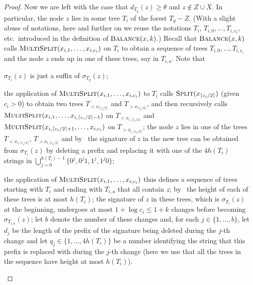 \documentclass[kpfonts]{patmorin}
\let\leq\leqslant
\let\geq\geqslant
\begin{document}
\begin{proof}
  Now we are left with the case that $d_{T_y}(z)\geq \theta$ and $z\not\in Z\cup X$. In particular, the node $z$ lies in some tree $T_i$ of the forest $T_y - Z$.
  (With a slight abuse of notations, here and further on we reuse the notations $T_i$, $T_{i,0},\ldots,T_{i,c_i}$, etc.\ introduced in the definition of $\textsc{Balance}(x,k)$.)
  Recall that $\textsc{Balance}(x,k)$ calls $\textsc{MultiSplit}(x_{i,1},\ldots,x_{i,c_i})$ on $T_i$ to obtain a sequence of trees $T_{i,0},\ldots,T_{i,c_i}$ and the node $z$ ends up in one of these trees, say in $T_{i,a}$.
  Note that
  \begin{compactenum}[(i)]
  \item $\sigma_{T_i}(z)$ is just a suffix of $\sigma_{T_y}(z)$;
  \item the application of $\textsc{MultiSplit}(x_{i,1},\ldots,x_{i,c_i})$ to $T_i$ calls $\textsc{Split}(x_{
  \lceil c_i/2\rceil})$ (given $c_i>0$) to obtain two trees $T_{<x_{\lceil c_i/2\rceil}}$ and $T_{>x_{\lceil c_i/2\rceil}}$, and then recursively calls $\textsc{MultiSplit}(x_{i,1},\ldots,x_{i,\lceil c_i/2\rceil-1})$  on $T_{<x_{i,\lceil c_i/2\rceil}}$ and $\textsc{MultiSplit}(x_{i,\lceil c_i/2\rceil+1},\ldots,x_{i,c_i})$  on $T_{>x_{i,\lceil c_i/2\rceil}}$;
  the node $z$ lies in one of the trees $T_{<x_{i,\lceil c_i/2\rceil}}$, $T_{>x_{i,\lceil c_i/2\rceil}}$ and by~ the signature of $z$ in the new tree can be obtained from $\sigma_{T_i}(z)$ by deleting a prefix and replacing it with one of the $4h(T_i)$ strings in $\bigcup_{j=0}^{h(T_i)-1}\{0^j,0^j1,1^j,1^j0\}$;
  \item the application of $\textsc{MultiSplit}(x_{i,1},\ldots,x_{i,c_i})$ thus defines a sequence of trees starting with $T_i$ and ending with $T_{i,a}$ that all contain $z$;
  by~ the height of each of these trees is at most $h(T_i)$;
  the signature of $z$ in these trees, which is $\sigma_{T_i}(z)$ at the beginning, undergoes at most $1+\log c_i \leq 1+k$ changes
  before becoming $\sigma_{T_{i,a}}(z)$; let $b$ denote the number of these changes and, for each $j\in\{1,\ldots,b\}$, let $d_j$ be the length of the prefix of the signature being deleted during the $j$-th change and let $q_j\in \{1, \dots, 4h(T_i)\}$ be a number identifying the string that this prefix is replaced with during the $j$-th change (here we use that all the trees in the sequence have height at most $h(T_i)$).
  \end{compactenum}


\end{proof}
\end{document}
